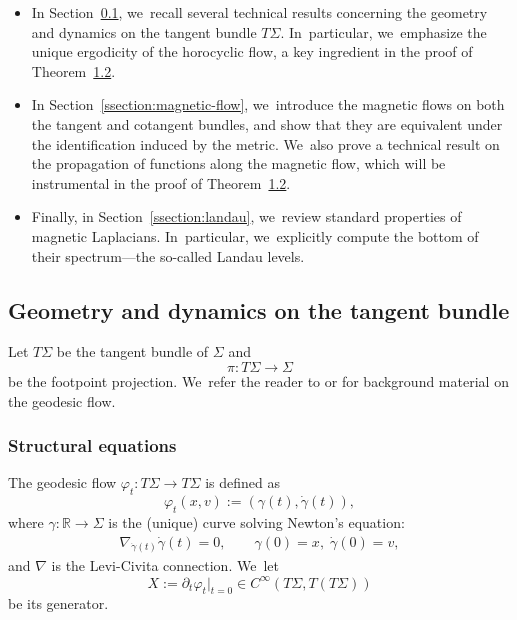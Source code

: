 \documentclass[10pt,a4paper]{amsart}
\theoremstyle{plain}
\theoremstyle{definition}
\newcommand{\R}{\mathbb{R}}
\begin{document}
\begin{itemize}
\item In Section~\ref{ssection:geo}, we~recall several technical results concerning the geometry and dynamics on the tangent bundle $T\Sigma$. In~particular, we~emphasize the unique ergodicity of the horocyclic flow, a key ingredient in the proof of Theorem~\href{https://jep.centre-mersenne.org/item/10.5802/jep.333.pdf#page=5}{1.2}.

\item In Section~\ref{ssection:magnetic-flow}, we~introduce the magnetic flows on both the tangent and cotangent bundles, and show that they are equivalent under the identification induced by the metric. We~also prove a technical result on the propagation of functions along the magnetic flow, which will be instrumental in the proof of Theorem~\href{https://jep.centre-mersenne.org/item/10.5802/jep.333.pdf#page=5}{1.2}.

\item Finally, in Section~\ref{ssection:landau}, we~review standard properties of magnetic Laplacians. In~particular, we~explicitly compute the bottom of their spectrum—the so-called Landau levels. \end{itemize}

\subsection{Geometry and dynamics on the tangent bundle}

\label{ssection:geo}
Let $T\Sigma$ be the tangent bundle of $\Sigma$ and
\begin{equation}
\label{equation:footpoint}
\pi : T\Sigma \to \Sigma
\end{equation}
be the footpoint projection. We~refer the reader to \cite[Ch.\,1]{Paternain-99} or \cite[Ch.\,13]{Lefeuvre-book} for background material on the geodesic flow.

\subsubsection{Structural equations} The geodesic flow $\varphi_t : T\Sigma \to T\Sigma$ is defined as
\[
\varphi_t(x,v) := (\gamma(t), \dot{\gamma}(t)),
\]
where $\gamma : \R \to \Sigma$ is the (unique) curve solving Newton's equation:
\begin{gather} \label{eq:newton_geodesic}
\nabla_{\dot{\gamma}(t)}\dot{\gamma}(t) = 0, \qquad \gamma(0)=x, \; \dot{\gamma}(0)=v,
\end{gather}
and $\nabla$ is the Levi-Civita connection. We~let
\[
X := \partial_t\varphi_t|_{t=0} \in C^\infty(T\Sigma, T(T\Sigma))
\]
be its generator.
\end{document}
